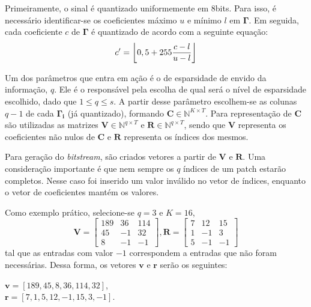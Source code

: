 \documentclass[cic,tc]{iiufrgs}
\renewcommand{\vec}[1]{\bm{#1}}
\newcommand{\mat}[1]{\bm{#1}}
\DeclarePairedDelimiter{\floor}{\lfloor}{\rfloor}
\begin{document}
Primeiramente, o sinal é quantizado uniformemente em 8bits. 
Para isso, é necessário identificar-se os coeficientes máximo $u$ e mínimo $l$ em $\mat{\Gamma}$.
Em seguida, cada coeficiente $c$ de $\mat{\Gamma}$ é quantizado de acordo com a seguinte equação:
\begin{equation*}
    c' = \floor*{0,5 + 255\frac{c - l}{u - l}}
\end{equation*}

Um dos parâmetros que entra em ação é o de esparsidade de envido da informação, $q$. 
Ele é o responsável pela escolha de qual será o nível de esparsidade escolhido,
dado que $1 \le q \le s$.
A partir desse parâmetro escolhem-se as colunas $q-1$ de cada $\mat{\Gamma_i}$ (já quantizado), 
formando $\mat{C} \in \mathbb{N}^{K \times T}$.
Para representação de $\mat{C}$ são utilizadas as matrizes $\mat{V} \in \mathbb{N}^{q \times T}$ e
$\mat{R} \in \mathbb{N}^{q \times T}$, sendo que $\mat{V}$ representa os coeficientes não nulos de
$\mat{C}$ e $\mat{R}$ representa os índices dos mesmos.

Para geração do \textit{bitstream}, são criados vetores a partir de $\mat{V}$ e $\mat{R}$.
Uma consideração importante é que nem sempre os $q$ índices de um patch estarão completos.
Nesse caso foi inserido um valor inválido no vetor de índices, enquanto o vetor de coeficientes
mantém os valores.

Como exemplo prático, selecione-se $q=3$ e $K=16$,
\begin{equation*}
    \mat{V} = 
    \begin{bmatrix}
        189 & 36 & 114 \\
        45  & -1 & 32  \\
        8   & -1 & -1
    \end{bmatrix},
    \mat{R} = 
    \begin{bmatrix}
        7 & 12 & 15 \\
        1  & -1 & 3  \\
        5   & -1 & -1
    \end{bmatrix}
\end{equation*}
tal que as entradas com valor $-1$ correspondem a entradas que não foram necessárias. 
Dessa forma, os vetores $\vec{v}$ e $\vec{r}$ serão os seguintes: 
\begin{center}
    $\vec{v} = \left[ 189, 45, 8, 36, 114, 32 \right]$, \\
    $\vec{r} = \left[ 7,1,5,12,-1,15,3,-1 \right]$.
\end{center}
\end{document}
